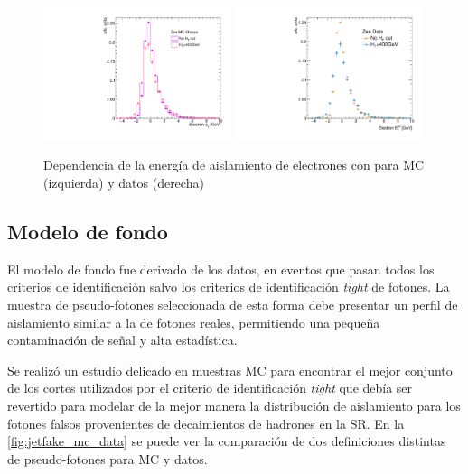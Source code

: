 \begin{figure}[!htbp]
  \centering

  \includegraphics[width=0.49\textwidth]{figures/electron_iso_ZeeHMC_corr}
  \includegraphics[width=0.49\textwidth]{figures/electron_iso_ZeeH_corr}

  \caption{Dependencia de la energía de aislamiento de electrones con {\HT}
    para MC (izquierda) y datos (derecha) \Zee}
    \label{fig:electron_iso_HT}

\end{figure}



\subsection{Modelo de fondo} \label{sec:jfake_bkg_template}

El modelo de fondo fue derivado de los datos, en eventos que pasan todos los
criterios de identificación salvo los criterios de identificación \emph{tight}
de fotones. La muestra de pseudo-fotones seleccionada de esta forma debe
presentar un perfil de aislamiento similar a la de fotones reales, permitiendo
una pequeña contaminación de señal y alta estadística.

Se realizó un estudio delicado en muestras MC para encontrar el mejor conjunto
de los cortes utilizados por el criterio de identificación \emph{tight} que debía ser
revertido para modelar de la mejor manera la distribución de aislamiento para
los fotones falsos provenientes de decaimientos de hadrones en la SR. En la
\cref{fig:jetfake_mc_data} se puede ver la comparación de dos definiciones
distintas de pseudo-fotones para MC y datos.

